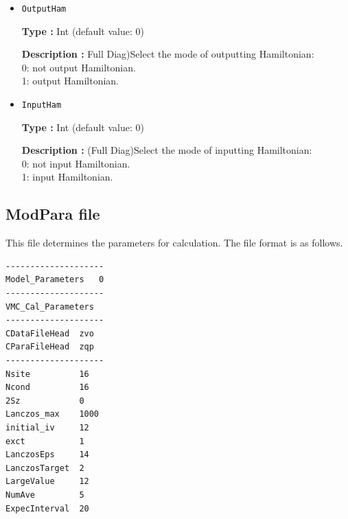 \begin{itemize}
{\bf Type :} {Int (default value: 0)}

{\bf Description :} {Select the mode of calculating dynamical Green's functions:\\
0: Not calculate  dynamical Green's functions\\
1: (not restart) Input an initial vector and files for generating single excited or pair excited states\\
2: Input components of triangular diagonal matrix\\
3: Output both components of triangular diagonal matrix and a restart vector\\
4: Input both components of triangular diagonal matrix and a restart vector\\
5: Input and output  both components of triangular diagonal matrix and a restart vector.\\
}

\item  \verb|OutputHam|

{\bf Type :} {Int (default value: 0)}

{\bf Description :} {Full Diag)Select the mode of outputting Hamiltonian:\\
0: not output Hamiltonian.\\
1: output Hamiltonian.\\
}

\item  \verb|InputHam|

{\bf Type :} {Int (default value: 0)}

{\bf Description :} {(Full Diag)Select the mode of inputting Hamiltonian:\\
0: not input Hamiltonian.\\
1: input Hamiltonian.\\
}


\end{itemize}

\newpage
\subsection{ModPara file}
\label{Subsec:modpara}
This file determines the parameters for calculation. The file format is as follows.\\
\begin{minipage}{10cm}
\begin{screen}
\begin{verbatim}
--------------------
Model_Parameters   0
--------------------
VMC_Cal_Parameters
--------------------
CDataFileHead  zvo
CParaFileHead  zqp
--------------------
Nsite          16   
Ncond          16    
2Sz            0 
Lanczos_max    1000 
initial_iv     12   
exct           1    
LanczosEps     14   
LanczosTarget  2    
LargeValue     12   
NumAve         5    
ExpecInterval  20   
\end{verbatim}
\end{screen}
\end{minipage}

